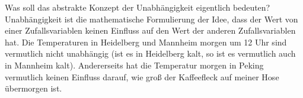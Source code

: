 \begin{bem1}
	Was soll das abstrakte Konzept der Unabh\"angigkeit eigentlich bedeuten? Unabh\"angigkeit ist die mathematische Formulierung der Idee, dass der Wert von einer Zufallsvariablen keinen Einfluss auf den Wert der anderen Zufallsvariablen hat. Die Temperaturen in Heidelberg und Mannheim morgen um 12 Uhr sind vermutlich nicht unabh\"angig (ist es in Heidelberg kalt, so ist es vermutlich auch in Mannheim kalt). Andererseits hat die Temperatur morgen in Peking vermutlich keinen Einfluss darauf, wie gro\ss{} der Kaffeefleck auf meiner Hose \"ubermorgen ist.
\end{bem1}